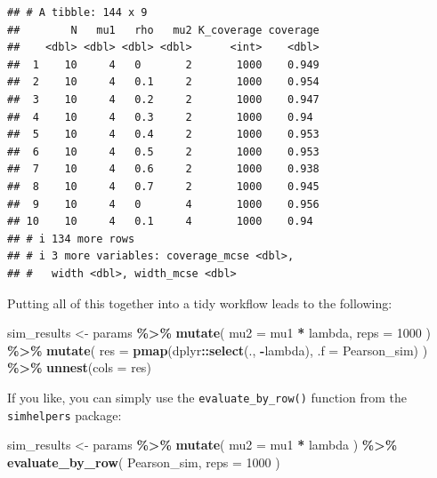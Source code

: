 \documentclass[
]{book}
\newenvironment{Shaded}{\begin{snugshade}}{\end{snugshade}}
\newcommand{\AttributeTok}[1]{\textcolor[rgb]{0.13,0.29,0.53}{#1}}
\newcommand{\DecValTok}[1]{\textcolor[rgb]{0.00,0.00,0.81}{#1}}
\newcommand{\FunctionTok}[1]{\textcolor[rgb]{0.13,0.29,0.53}{\textbf{#1}}}
\newcommand{\NormalTok}[1]{#1}
\newcommand{\OtherTok}[1]{\textcolor[rgb]{0.56,0.35,0.01}{#1}}
\newcommand{\SpecialCharTok}[1]{\textcolor[rgb]{0.81,0.36,0.00}{\textbf{#1}}}
\begin{document}
\begin{verbatim}
## # A tibble: 144 x 9
##        N   mu1   rho   mu2 K_coverage coverage
##    <dbl> <dbl> <dbl> <dbl>      <int>    <dbl>
##  1    10     4   0       2       1000    0.949
##  2    10     4   0.1     2       1000    0.954
##  3    10     4   0.2     2       1000    0.947
##  4    10     4   0.3     2       1000    0.94 
##  5    10     4   0.4     2       1000    0.953
##  6    10     4   0.5     2       1000    0.953
##  7    10     4   0.6     2       1000    0.938
##  8    10     4   0.7     2       1000    0.945
##  9    10     4   0       4       1000    0.956
## 10    10     4   0.1     4       1000    0.94 
## # i 134 more rows
## # i 3 more variables: coverage_mcse <dbl>,
## #   width <dbl>, width_mcse <dbl>
\end{verbatim}

Putting all of this together into a tidy workflow leads to the following:

\begin{Shaded}
\begin{Highlighting}[]
\NormalTok{sim\_results }\OtherTok{\textless{}{-}} 
\NormalTok{  params }\SpecialCharTok{\%\textgreater{}\%}
  \FunctionTok{mutate}\NormalTok{(}
    \AttributeTok{mu2 =}\NormalTok{ mu1 }\SpecialCharTok{*}\NormalTok{ lambda,}
    \AttributeTok{reps =} \DecValTok{1000}
\NormalTok{  ) }\SpecialCharTok{\%\textgreater{}\%}
  \FunctionTok{mutate}\NormalTok{(}
    \AttributeTok{res =} \FunctionTok{pmap}\NormalTok{(dplyr}\SpecialCharTok{::}\FunctionTok{select}\NormalTok{(., }\SpecialCharTok{{-}}\NormalTok{lambda), }\AttributeTok{.f =}\NormalTok{ Pearson\_sim)}
\NormalTok{  ) }\SpecialCharTok{\%\textgreater{}\%}
  \FunctionTok{unnest}\NormalTok{(}\AttributeTok{cols =}\NormalTok{ res)}
\end{Highlighting}
\end{Shaded}

If you like, you can simply use the \texttt{evaluate\_by\_row()} function from the \texttt{simhelpers} package:

\begin{Shaded}
\begin{Highlighting}[]
\NormalTok{sim\_results }\OtherTok{\textless{}{-}} 
\NormalTok{  params }\SpecialCharTok{\%\textgreater{}\%}
  \FunctionTok{mutate}\NormalTok{( }\AttributeTok{mu2 =}\NormalTok{ mu1 }\SpecialCharTok{*}\NormalTok{ lambda ) }\SpecialCharTok{\%\textgreater{}\%}
  \FunctionTok{evaluate\_by\_row}\NormalTok{( Pearson\_sim, }\AttributeTok{reps =} \DecValTok{1000}\NormalTok{ )}
\end{Highlighting}
\end{Shaded}
\end{document}
